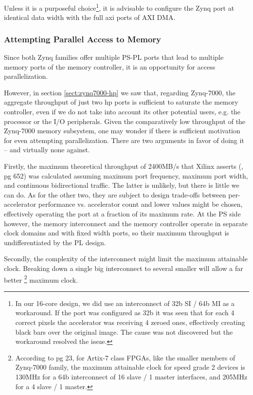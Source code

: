 Unless it is a purposeful choice\footnote{
In our 16-core design, we did use an interconnect of 32b SI / 64b MI as a workaround. 
If the port was configured as 32b it was seen that for each 4 correct pixels the accelerator
was receiving 4 zeroed ones, effectively creating black bars over the original image.
The cause was not discovered but the workaround resolved the issue.},
it is advisable to configure the Zynq port at identical data width with the
full \gls{axi} ports of AXI DMA.

\subsubsection{Attempting Parallel Access to Memory}

Since both Zynq families offer multiple PS-PL ports that lead to
multiple memory ports of the memory controller,
it is an opportunity for access parallelization.

However, in section \ref{sect:zynq7000-hp}
we saw that, regarding Zynq-7000,
the aggregate throughput of just two \gls{hp} ports
is sufficient to saturate the memory controller,
even if we do not take into account its other potential users,
e.g. the processor or the I/O peripherals.
Given the comparatively low throughput of the Zynq-7000 memory subsystem,
one may wonder if there is sufficient motivation for even attempting parallelization.
There are two arguments in favor of doing it -- and virtually none against.

Firstly, the maximum theoretical throughput of 2400MB/s that Xilinx asserts (\cite{ug585}, pg 652)
was calculated assuming maximum port frequency, maximum port width, and continuous bidirectional
traffic. The latter is unlikely, but there is little we can do. As for the other two,
they are subject to design trade-offs between per-accelerator performance vs. accelerator count
and lower values might be chosen, effectively operating the port at a fraction of its
maximum rate. At the PS side however, the memory interconnect and the memory controller
operate in separate clock domains and with fixed width ports,
so their maximum throughput is undifferentiated by the PL design.

Secondly, the complexity of the interconnect might limit the maximum attainable clock.
Breaking down a single big interconnect to several smaller will allow a far better
	\footnote{
		According to \cite{pg059} pg 23, for Artix-7 class FPGAs,
		like the smaller members of Zynq-7000 family, the maximum attainable
		clock for speed grade 2 devices is 130MHz for a 64b interconnect of
		16 slave / 1 master interfaces, and 205MHz for a 4 slave / 1 master.
	}
maximum clock.

